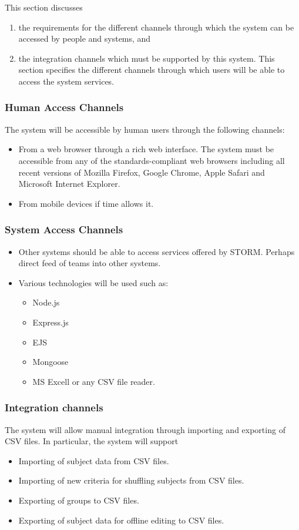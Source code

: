 This section discusses
\begin {enumerate}
\item the requirements for the different channels through which the system can be accessed by
people and systems, and
\item the integration channels which must be supported by this system.
This section specifies the different channels through which users will be able to access the system
services.
\end{enumerate}
\subsubsection{Human Access Channels}
The system will be accessible by human users through the following channels:\par
\begin{itemize}
\item From a web browser through a rich web interface. The system must be accessible from any of the standards-compliant web browsers including all recent versions of Mozilla Firefox, Google Chrome, Apple Safari and Microsoft Internet Explorer.
\item From mobile devices if time allows it.
\end{itemize}
\subsubsection{System Access Channels}
\begin{itemize}
\item Other systems should be able to access services offered by STORM. Perhaps direct feed of teams into other systems.
\item Various technologies will be used such as:
	\begin{itemize}
	\item Node.js
	\item Express.js
	\item EJS
	\item Mongoose
	\item MS Excell or any CSV file reader.
	\end{itemize}
\end{itemize}
\subsubsection{Integration channels}
The system will allow manual integration through importing and exporting of CSV
files. In particular, the system will support
\begin{itemize}
\item Importing of subject data from CSV files.
\item Importing of new criteria for shuffling subjects from CSV files.
\item Exporting of groups to CSV files.
\item Exporting of subject data for offline editing to CSV files.
\end{itemize}


